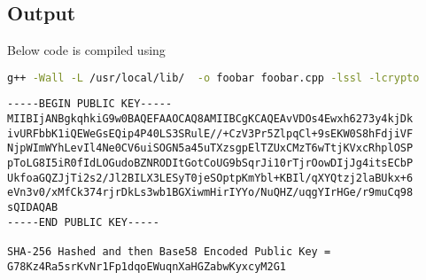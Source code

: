 \section{}

\subsection{Output}
Below code is compiled using 
\begin{lstlisting}[language=bash]
g++ -Wall -L /usr/local/lib/  -o foobar foobar.cpp -lssl -lcrypto
\end{lstlisting}
\begin{lstlisting}
-----BEGIN PUBLIC KEY-----
MIIBIjANBgkqhkiG9w0BAQEFAAOCAQ8AMIIBCgKCAQEAvVDOs4Ewxh6273y4kjDk
ivURFbbK1iQEWeGsEQip4P40LS3SRulE//+CzV3Pr5ZlpqCl+9sEKW0S8hFdjiVF
NjpWImWYhLevIl4Ne0CV6uiSOGN5a45uTXzsgpElTZUxCMzT6wTtjKVxcRhplOSP
pToLG8I5iR0fIdLOGudoBZNRODItGotCoUG9bSqrJi10rTjrOowDIjJg4itsECbP
UkfoaGQZJjTi2s2/Jl2BILX3LESyT0jeSOptpKmYbl+KBIl/qXYQtzj2laBUkx+6
eVn3v0/xMfCk374rjrDkLs3wb1BGXiwmHirIYYo/NuQHZ/uqgYIrHGe/r9muCq98
sQIDAQAB
-----END PUBLIC KEY-----

SHA-256 Hashed and then Base58 Encoded Public Key = 
G78Kz4Ra5srKvNr1Fp1dqoEWuqnXaHGZabwKyxcyM2G1
\end{lstlisting}
